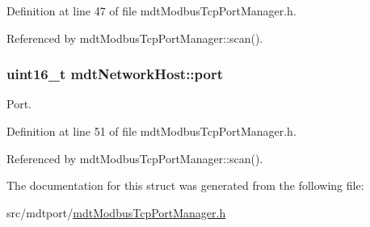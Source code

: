 Definition at line 47 of file mdt\-Modbus\-Tcp\-Port\-Manager.\-h.



Referenced by mdt\-Modbus\-Tcp\-Port\-Manager\-::scan().

\hypertarget{structmdt_network_host_aa6c1fee525513ea51948add0c1d05034}{
\subsubsection[{port}]{\setlength{\rightskip}{0pt plus 5cm}uint16\-\_\-t mdt\-Network\-Host\-::port}}\label{structmdt_network_host_aa6c1fee525513ea51948add0c1d05034}


Port. 



Definition at line 51 of file mdt\-Modbus\-Tcp\-Port\-Manager.\-h.



Referenced by mdt\-Modbus\-Tcp\-Port\-Manager\-::scan().



The documentation for this struct was generated from the following file\-:\begin{DoxyCompactItemize}
\item 
src/mdtport/\hyperlink{mdt_modbus_tcp_port_manager_8h}{mdt\-Modbus\-Tcp\-Port\-Manager.\-h}\end{DoxyCompactItemize}
